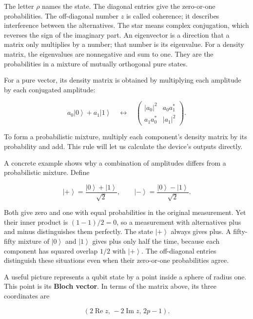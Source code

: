 \documentclass[11pt,letterpaper]{article}
\begin{document}
The letter \(\rho\) names the state. The diagonal entries give the zero-or-one probabilities. The off-diagonal number \(z\) is called coherence; it describes interference between the alternatives. The star means complex conjugation, which reverses the sign of the imaginary part. An eigenvector is a direction that a matrix only multiplies by a number; that number is its eigenvalue. For a density matrix, the eigenvalues are nonnegative and sum to one. They are the probabilities in a mixture of mutually orthogonal pure states.

For a pure vector, its density matrix is obtained by multiplying each amplitude by each conjugated amplitude:

\[a_{0}\left| 0 \right\rangle + a_{1}\left| 1 \right\rangle\quad \leftrightarrow \quad\begin{pmatrix}
\left| a_{0} \right|^{2} & a_{0}a_{1}^{*} \\
a_{1}a_{0}^{*} & \left| a_{1} \right|^{2}
\end{pmatrix}.\]

To form a probabilistic mixture, multiply each component's density matrix by its probability and add. This rule will let us calculate the device's outputs directly.

A concrete example shows why a combination of amplitudes differs from a probabilistic mixture. Define

\[\left| + \right\rangle = \frac{\left| 0 \right\rangle + \left| 1 \right\rangle}{\sqrt{2}},\quad\quad\left| - \right\rangle = \frac{\left| 0 \right\rangle - \left| 1 \right\rangle}{\sqrt{2}}.\]

Both give zero and one with equal probabilities in the original measurement. Yet their inner product is \((1 - 1)/2 = 0\), so a measurement with alternatives plus and minus distinguishes them perfectly. The state \(\left| + \right\rangle\) always gives plus. A fifty-fifty mixture of \(\left| 0 \right\rangle\) and \(\left| 1 \right\rangle\) gives plus only half the time, because each component has squared overlap \(1/2\) with \(\left| + \right\rangle\). The off-diagonal entries distinguish these situations even when their zero-or-one probabilities agree.

A useful picture represents a qubit state by a point inside a sphere of radius one. This point is its \textbf{Bloch vector}. In terms of the matrix above, its three coordinates are

\[(2\operatorname{Re}z,\, - 2\operatorname{Im}z,\, 2p - 1).\]
\end{document}
